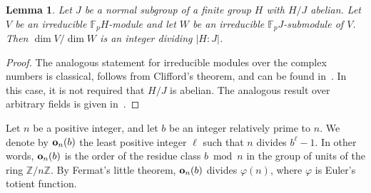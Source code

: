 \documentclass{amsart}
\newtheorem{lemma}[theorem]{Lemma}
\begin{document}
\begin{lemma}\label{lemma:navarro}
Let $J$ be a normal subgroup of a finite group $H$ with $H/J$ abelian. Let $V$ be an irreducible $\mathbb{F}_pH$-module and let $W$ be an irreducible $\mathbb{F}_pJ$-submodule of $V$. Then $\dim V/\dim W$ is an integer dividing $|H:J|$.
\end{lemma}
\begin{proof}
The analogous statement for irreducible modules over the complex numbers is classical, follows from Clifford's theorem, and can be found in~\cite[page~84 and Chapter~11]{Isaacs}. In this case, it is not required that $H/J$ is abelian. The analogous result over arbitrary fields is given in~\cite{Navarro}.
\end{proof}


Let $n$ be a positive integer, and let $b$ be an integer relatively prime to $n$. We denote by ${\bf o}_n(b)$ the least positive integer $\ell$ such that $n$ divides $b^\ell - 1$. In other words, ${\bf o}_n(b)$ is the order of the residue class $b \bmod n$ in the group of units of the ring $\mathbb{Z}/n\mathbb{Z}$. By Fermat's little theorem, ${\bf o}_n(b)$ divides $\varphi(n)$, where $\varphi$ is Euler's totient function.
\end{document}
